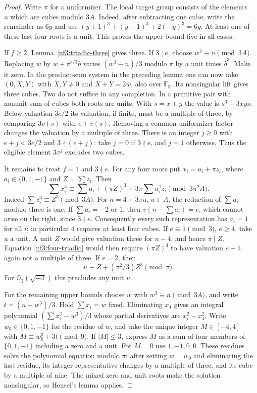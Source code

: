 \documentclass[11pt,letterpaper]{article}
\theoremstyle{definition}
\numberwithin{equation}{section}
\begin{document}
\begin{proof}
Write $\pi$ for a uniformizer. The local target group consists of the
elements $n$ which are cubes modulo $3A$. Indeed, after subtracting
one cube, write the remainder as $6y$ and use
$(y+1)^3+(y-1)^3+2(-y)^3=6y$. At least one of these last four
roots is a unit. This proves the upper bound five in all cases.

If $f\ge2$, Lemma~\ref{nf3:triadic-three} gives three.
If $3\mid e$, choose $w^3\equiv n\pmod{3A}$. Replacing $w$ by
$w+\pi^{e/3}b$ varies $(w^3-n)/3$ modulo $\pi$ by a unit times
$\bar b^3$. Make it zero. In the product-sum system in the preceding
lemma one can now take $(0,X,Y)$ with $X,Y\ne0$ and $X+Y=2\bar w$,
also over $\mathbb F_3$. Its nonsingular lift gives three cubes.
Two do not suffice in any completion. In a primitive pair with
nonunit sum of cubes both roots are units. With $s=x+y$ the value
is $s^3-3xys$. Below valuation $3e/2$ its valuation, if finite,
must be a multiple of three, by comparing $3v(s)$ with $e+v(s)$.
Removing a common uniformizer factor changes the valuation by a
multiple of three. There is an integer $j\ge0$ with
$e+j<3e/2$ and $3\nmid(e+j)$: take $j=0$ if $3\nmid e$,
and $j=1$ otherwise. Thus the eligible element $3\pi^j$ excludes
two cubes.

It remains to treat $f=1$ and $3\nmid e$. For any four roots put
$x_i=a_i+\pi z_i$, where $a_i\in\{0,1,-1\}$ and $Z=\sum z_i$.
Then
\begin{equation}\label{nf3:four-triadic}
 \sum x_i^3\equiv
     \sum a_i + (\pi Z)^3+3\pi\sum a_i^2z_i\pmod{3\pi^2 A}.
\end{equation}
Indeed $\sum z_i^3\equiv Z^3\pmod{3A}$.
For $n=4+3\pi u$, $u\in A$, the reduction of $\sum a_i$ modulo
three is one. If $\sum a_i=-2$ or $1$, then $v(n-\sum a_i)=e$,
which cannot arise on the right, since $3\nmid e$.
Consequently every such representation has $a_i=1$ for all $i$;
in particular $4$ requires at least four cubes. If
$e\equiv1\pmod3$, $e\ge4$, take $u$ a unit. A unit $Z$ would give
valuation three for $n-4$, and hence $\pi\mid Z$. Equation
\eqref{nf3:four-triadic} would then require $(\pi Z)^3$ to have
valuation $e+1$, again not a multiple of three. If $e=2$, then
\[
   u\equiv Z+(\pi^2/3)Z^3\pmod\pi.
\]
For $\mathbb Q_3(\sqrt{-3})$ this precludes any unit $u$.

For the remaining upper bounds choose $w$ with $w^3\equiv n\pmod{3A}$,
and write $t=(n-w^3)/3$. Hold $\sum x_i=w$ fixed. Eliminating
$x_4$ gives an integral polynomial $(\sum x_i^3-w^3)/3$ whose
partial derivatives are $x_i^2-x_4^2$. Write $w_0\in\{0,1,-1\}$
for the residue of $w$, and take the unique integer $M\in[-4,4]$
with $M\equiv w_0^3+3\bar t\pmod9$. If $|M|\le3$, express $M$
as a sum of four members of $\{0,1,-1\}$ including a zero and a
unit. For $M=0$ use $1,-1,0,0$. These residues solve the polynomial
equation modulo $\pi$: after setting $w=w_0$ and eliminating the
last residue, its integer representative changes by a multiple of
three, and its cube by a multiple of nine. The mixed zero and unit
roots make the solution nonsingular, so Hensel's lemma applies.


\end{proof}
\end{document}
